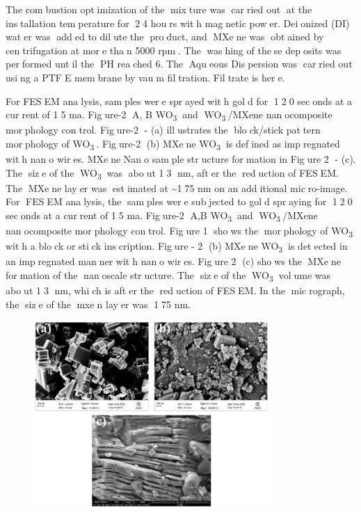 {The combustion optimization of the mixture was carried out at
the installation temperature for 24 hours with magnetic power.
Deionized (DI) water was added to dilute the product, and MXene
was obtained by centrifugation at more than 5000 rpm. The
washing of these deposits was performed until the PH reached 6.
The Aqueous Dispersion was carried out using a PTFE membrane by
vaum filtration. Filtrate is here.

For FESEM analysis, samples were sprayed with gold for 120
seconds at a current of 15 ma. Figure-2 A, B WO\textsubscript{3}
and WO\textsubscript{3}/MXene nanocomposite morphology control.
Figure-2 - (a) illustrates the block/stick pattern morphology of
WO\textsubscript{3}. Figure-2 (b) MXene WO\textsubscript{3} is
defined as impregnated with nano wires. MXene Nano sample
structure formation in Figure 2 - (c). The size of the
WO\textsubscript{3} was about 13 nm, after the reduction of
FESEM. The MXene layer was estimated at \textasciitilde175 nm on
an additional micro-image. For FESEM analysis, the samples were
subjected to gold spraying for 120 seconds at a current of 15
ma. Figure-2 A,B WO\textsubscript{3} and WO\textsubscript{3}/MXene
nanocomposite morphology control. Figure 1 shows the morphology
of WO\textsubscript{3} with a block or stick inscription. Figure -
2 (b) MXene WO\textsubscript{3} is detected in an impregnated
manner with nano wires. Figure 2 (c) shows the MXene formation
of the nanoscale structure. The size of the WO\textsubscript{3}
volume was about 13 nm, which is after the reduction of FESEM.
In the micrograph, the size of the mxen layer was 175 nm.

\begin{figure}[H]
	\centering
	\includegraphics[width=0.8\textwidth]{media/chem2/image13}
	\caption*{}
\end{figure}


}
